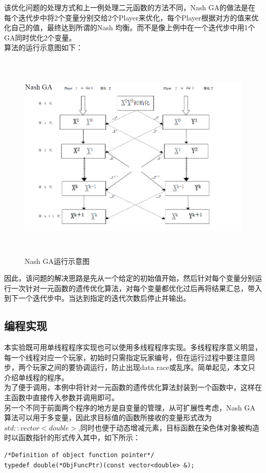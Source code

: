 \documentclass[UTF8]{ctexart}
\begin{document}
\indent 该优化问题的处理方式和上一例处理二元函数的方法不同，Nash GA的做法是在每个迭代步中将2个变量分别交给2个Player来优化，每个Player根据对方的值来优化自己的值，最终达到所谓的Nash 均衡。而不是像上例中在一个迭代步中用1个GA同时优化2个变量。\\
\indent 算法的运行示意图如下：
\begin{figure}[htbp]\centering
\includegraphics[width=14cm,height=10cm]{../pic/T2_illus.png}
\caption{Nash GA运行示意图}
\end{figure}

\indent 因此，该问题的解决思路是先从一个给定的初始值开始，然后针对每个变量分别运行一次针对一元函数的遗传优化算法，对每个变量都优化过后再将结果汇总，带入到下一个迭代步中。当达到指定的迭代次数后停止并输出。

\subsection{编程实现}
本实验既可用单线程程序实现也可以使用多线程程序实现。多线程程序意义明显，每一个线程对应一个玩家，初始时只需指定玩家编号，但在运行过程中要注意同步，两个玩家之间的要协调运行，防止出现data race或乱序。简单起见，本文只介绍单线程的程序。\\
\indent 为了便于调用，本例中将针对一元函数的遗传优化算法封装到一个函数中，这样在主函数中直接传入参数并调用即可。\\
\indent 另一个不同于前面两个程序的地方是自变量的管理，从可扩展性考虑，Nash GA算法可以用于多变量，因此求目标值的函数所接收的变量形式改为$std::vector<double>$,同时也便于动态增减元素，目标函数在染色体对象被构造时以函数指针的形式传入其中，如下所示：
\begin{lstlisting}
/*Definition of object function pointer*/
typedef double(*ObjFuncPtr)(const vector<double> &);
\end{lstlisting}
\end{document}
